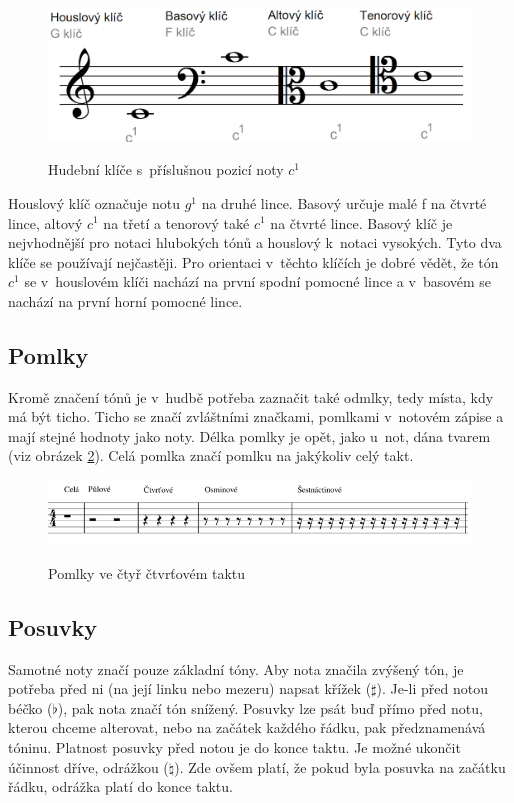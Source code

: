\begin{figure}[h]\centering
    \centering
    \includegraphics[width=0.6\linewidth]{obrazky/Klíče.png}\\[1pt]  
    \caption{Hudební klíče s~příslušnou pozicí noty $c^1$}    
    \label{obrazek4Klice}
\end{figure}

Houslový klíč označuje notu $g^1$ na druhé lince.
Basový určuje malé f na čtvrté lince, altový $c^1$ na třetí 
a tenorový také $c^1$ na čtvrté lince.
Basový klíč je nejvhodnější pro notaci hlubokých tónů 
a houslový k~notaci vysokých.
Tyto dva klíče se používají nejčastěji. 
Pro orientaci v~těchto klíčích je dobré vědět, že
tón $c^1$ se v~houslovém klíči nachází na první spodní pomocné lince 
a v~basovém se nachází na první horní pomocné lince.
\cite{cmiral,zenkl}
\par

\subsection{Pomlky}
Kromě značení tónů je v~hudbě potřeba zaznačit také odmlky,
tedy místa, kdy má být ticho.
Ticho se značí zvláštními značkami, pomlkami v~notovém zápise 
a mají stejné hodnoty jako noty.
Délka pomlky je opět, jako u~not, 
dána tvarem (viz obrázek \ref{obrazekPomlky}).
Celá pomlka značí pomlku na jakýkoliv celý takt.
\cite{cmiral,zenkl}

\begin{figure}[h]\centering
    \centering
    \includegraphics[width=0.8\linewidth]{obrazky/pomlky.png}\\[1pt]  
    \caption{Pomlky ve čtyř čtvrťovém taktu}    
    \label{obrazekPomlky}
\end{figure}

\subsection{Posuvky}
\label{kapitolaPosuvky}
Samotné noty značí pouze základní tóny.
Aby nota značila zvýšený tón, 
je potřeba před ni (na její linku nebo mezeru) napsat křížek ($\sharp $).
Je-li před notou béčko ($\flat $), pak nota značí tón snížený.
Posuvky lze psát buď přímo před notu, kterou chceme alterovat, 
nebo na začátek každého řádku, pak předznamenává tóninu.
Platnost posuvky před notou je do konce taktu.
Je možné ukončit účinnost dříve, odrážkou ($\natural $).
Zde ovšem platí, že pokud byla posuvka na začátku řádku, 
odrážka platí do konce taktu.
\cite{cmiral,zenkl}

